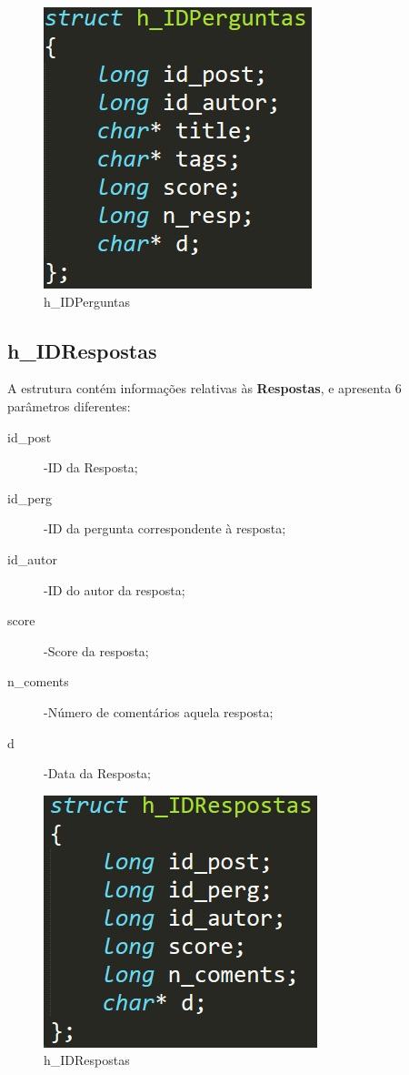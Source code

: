 \documentclass[a4paper]{article}
\begin{document}
	\begin{figure}[ht]
	\centering
	\includegraphics[scale =0.25]{perguntas.png}
	\caption{h_IDPerguntas}
	\label{img:h_IDPerguntas}
	\end{figure}

	\subsection{h_IDRespostas}
	A estrutura contém informações relativas às \textbf{Respostas}, e apresenta 6 parâmetros diferentes:

	\begin{description}
		\item[id_post] -ID da Resposta;
		\item[id_perg] -ID da pergunta correspondente à resposta;
		\item[id_autor] -ID do autor da resposta;
		\item[score] -Score da resposta;
		\item[n_coments] -Número de comentários aquela resposta;
		\item[d] -Data da Resposta;

	\end{description}


	

	\begin{figure}[ht]
	\centering
	\includegraphics[scale =0.25]{respostas.png}
	\caption{h_IDRespostas}
	\label{img:h_IDRespostas}
	\end{figure}
\end{document}
